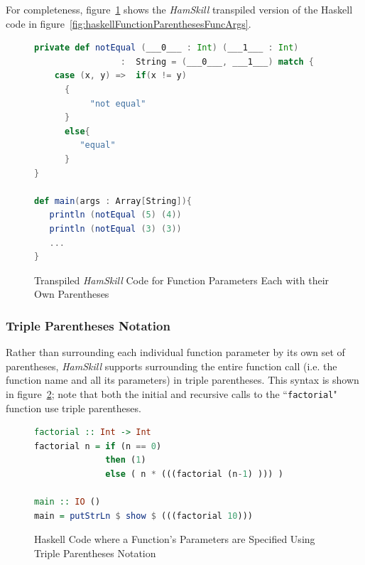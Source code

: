 \documentclass{report}
\begin{document}
For completeness, figure~\ref{fig:scalaFunctionParenthesesFuncArgs} shows the \textit{HamSkill} transpiled version of the Haskell code in figure~\ref{fig:haskellFunctionParenthesesFuncArgs}.

\begin{figure}[H]
\begin{mdframed}
\begin{lstlisting}[language=Scala, showstringspaces=false]
private def notEqual (___0___ : Int) (___1___ : Int) 
                 :  String = (___0___, ___1___) match {
    case (x, y) =>  if(x != y)
      {
           "not equal"
      }
      else{
         "equal"
      }
} 
  
def main(args : Array[String]){
   println (notEqual (5) (4))
   println (notEqual (3) (3))
   ...
}
\end{lstlisting}
\end{mdframed}
\caption{Transpiled \textit{HamSkill} Code for Function Parameters Each with their Own Parentheses}\label{fig:scalaFunctionParenthesesFuncArgs}
\end{figure}

\subsubsection{Triple Parentheses Notation}

Rather than surrounding each individual function parameter by its own set of parentheses, \textit{HamSkill} supports surrounding the entire function call (i.e. the function name and all its parameters) in triple parentheses.  This syntax is shown in figure~\ref{fig:haskellFunctionFactorial}; note that both the initial and recursive calls to the ``\texttt{factorial}" function use triple parentheses.

\begin{figure}[H]
\begin{mdframed}
\begin{lstlisting}[language=Haskell]
factorial :: Int -> Int
factorial n = if (n == 0)
              then (1)
              else ( n * (((factorial (n-1) ))) )

main :: IO ()
main = putStrLn $ show $ (((factorial 10)))
\end{lstlisting}
\end{mdframed}
\caption{Haskell Code where a Function's Parameters are Specified Using Triple Parentheses Notation}\label{fig:haskellFunctionFactorial}
\end{figure}
\end{document}
